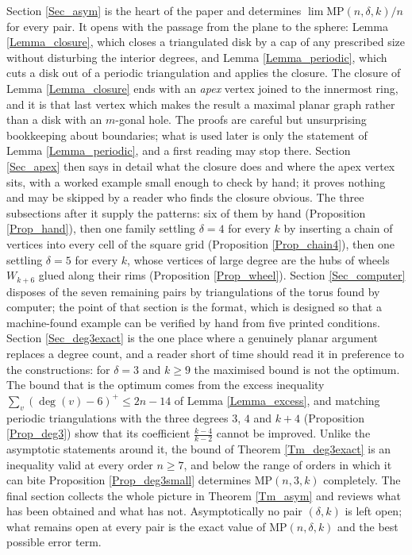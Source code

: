 \documentclass[12pt,a4paper]{article}%
\begin{document}
Section \ref{Sec_asym} is the heart of the paper and determines $\lim \mathrm{MP}(n,\delta ,k)/n$ for
every pair. It opens with the passage from the plane to the sphere: Lemma \ref{Lemma_closure}, which
closes a triangulated disk by a cap of any prescribed size without disturbing the interior degrees, and Lemma \ref{Lemma_periodic}, which cuts a disk out of a periodic triangulation and applies the closure.
The closure of Lemma \ref{Lemma_closure} ends with an \emph{apex} vertex joined to the innermost ring, and it
is that last vertex which makes the result a maximal planar graph rather than a
disk with an $m$-gonal hole.
The proofs are careful but unsurprising bookkeeping about boundaries; what is used later is only the
statement of Lemma \ref{Lemma_periodic}, and a first reading may stop there. Section \ref{Sec_apex} then
says in detail what the closure does and where the apex vertex sits, with a worked example small enough
to check by hand; it proves nothing and may be skipped by a reader who finds the closure obvious. The
three subsections after it supply the patterns: six of them by hand (Proposition \ref{Prop_hand}), then one family
settling $\delta =4$ for every $k$ by inserting a chain of vertices into every cell of the square grid
(Proposition \ref{Prop_chain4}), then one settling $\delta =5$ for every $k$, whose vertices of large
degree are the hubs of wheels $W_{k+6}$ glued along their rims (Proposition \ref{Prop_wheel}). Section
\ref{Sec_computer} disposes of the seven remaining pairs by triangulations of the torus found by
computer; the point of that section is the format, which is designed so that a machine-found example can
be verified by hand from five printed conditions. Section \ref{Sec_deg3exact} is the one place where a
genuinely planar argument replaces a degree count, and a reader short of time should read it in
preference to the constructions: for $\delta =3$ and $k\geq 9$ the maximised bound is not the optimum. The
bound that is the optimum comes from the excess inequality $\sum_{v}(\deg (v)-6)^{+}\leq 2n-14$ of Lemma
\ref{Lemma_excess}, and matching
periodic triangulations with the three degrees $3$, $4$ and $k+4$ (Proposition \ref{Prop_deg3}) show
that its coefficient $\frac{k-4}{k-2}$ cannot be improved. Unlike the asymptotic statements around it,
the bound of Theorem \ref{Tm_deg3exact} is an inequality valid at every order $n\geq 7$, and below the
range of orders in which it can bite Proposition \ref{Prop_deg3small} determines
$\mathrm{MP}(n,3,k)$ completely. 
The final section collects the whole picture in Theorem \ref{Tm_asym} and reviews what has been obtained and what has not. Asymptotically no pair
$(\delta ,k)$ is left open; what remains open at every pair is the exact value of
$\mathrm{MP}(n,\delta ,k)$ and the best possible error term.
\end{document}
